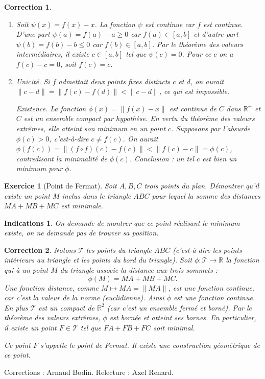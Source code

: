 \documentclass[11pt,a4paper]{article}
\newcommand{\Rr}{\mathbb{R}} \newcommand{\R}{\mathbb{R}}
\renewcommand{\ge}{\geqslant} \renewcommand{\geq}{\geqslant}
\renewcommand{\le}{\leqslant} \renewcommand{\leq}{\leqslant}
\theoremstyle{exostyle}
\newtheorem{exo}{Exercice}
\newtheorem{ind}{Indications}
\newtheorem{cor}{Correction}
\newcommand{\exercice}[1]{} \newcommand{\finexercice}{}
\newcommand{\enonce}{\begin{exo}} \newcommand{\finenonce}{\end{exo}}
\newcommand{\indication}{\begin{ind}} \newcommand{\finindication}{\end{ind}}
\newcommand{\correction}{\begin{cor}} \newcommand{\fincorrection}{\end{cor}}
\begin{document}
\correction
\begin{enumerate}
	\item Soit $\psi(x) = f(x)-x$. La fonction $\psi$ est continue car $f$ est continue.
	D'une part $\psi(a) = f(a)-a \ge 0$ car $f(a) \in [a,b]$ et d'autre part $\psi(b) = f(b) -b \le 0$ car $f(b) \in [a,b]$. Par le théorème des valeurs intermédiaires, il existe $c \in [a,b]$ tel que $\psi(c)=0$. Pour ce $c$ on a $f(c)-c=0$, soit $f(c)=c$.
	
	\item Unicité. Si $f$ admettait deux points fixes distincts $c$ et $d$, on aurait $\| c - d \| = \|f(c) - f(d) \| < \| c - d \|$, ce qui est impossible.
	
	Existence. La fonction $\phi(x) = \|f (x) - x \|$ est continue de $C$ dans $\Rr^+$ et $C$ est un ensemble compact par hypothèse. En vertu du théorème des valeurs extrêmes, elle atteint
	son minimum en un point $c$. Supposons par l'absurde $\phi(c) > 0$, c’est-à-dire $c \neq f(c)$.
	On aurait $\phi(f(c)) = \| (f \circ f)(c) - f(c) \| <  \| f(c)-c \| = \phi(c)$, contredisant la minimalité de $\phi(c)$. Conclusion : un tel $c$ est bien un minimum pour $\phi$.
\end{enumerate}
\fincorrection
\finexercice


\exercice{}
\enonce[Point de Fermat]
Soit $A, B, C$ trois points du plan. Démontrer qu’il existe un point
$M$ inclus dans le triangle $ABC$ pour lequel la somme des distances $MA + MB + MC$ est minimale.
\finenonce

\indication
On demande de montrer que ce point réalisant le minimum existe, on ne demande pas de trouver sa position.
\finindication


\correction
Notons $\mathcal{T}$ les points du triangle $ABC$ (c'est-à-dire les points intérieurs au triangle et les points du bord du triangle).
Soit $\phi : \mathcal{T} \to \Rr$ la fonction qui à un point $M$ du triangle associe la distance aux trois sommets :
\[ \phi(M) = MA + MB + MC. \]
Une fonction distance, comme $M \mapsto MA =  \| MA \|$, est une fonction continue, car c'est la valeur de la norme (euclidienne).
Ainsi $\phi$ est une fonction continue.
En plus $\mathcal{T}$ est un compact de $\Rr^2$ (car c'est un ensemble fermé et borné).
Par le théorème des valeurs extrêmes, $\phi$ est bornée et atteint ses bornes. En particulier, il existe un point $F \in \mathcal{T}$ tel que $FA+FB+FC$ soit minimal.

Ce point $F$ s'appelle le point de Fermat. Il existe une construction géométrique de ce point.
\fincorrection

\finexercice


\bigskip

Corrections : Arnaud Bodin. Relecture : Axel Renard.
\end{document}
